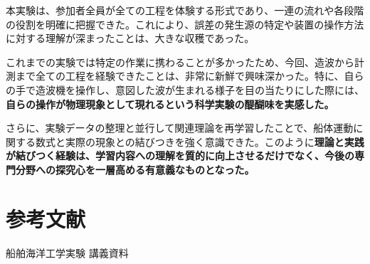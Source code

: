 \documentclass[dvipdfmx,a4paper]{jreport} %
\begin{document}
本実験は、参加者全員が全ての工程を体験する形式であり、一連の流れや各段階の役割を明確に把握できた。これにより、誤差の発生源の特定や装置の操作方法に対する理解が深まったことは、大きな収穫であった。

これまでの実験では特定の作業に携わることが多かったため、今回、造波から計測まで全ての工程を経験できたことは、非常に新鮮で興味深かった。特に、自らの手で造波機を操作し、意図した波が生まれる様子を目の当たりにした際には、\textbf{自らの操作が物理現象として現れるという科学実験の醍醐味を実感した。}

さらに、実験データの整理と並行して関連理論を再学習したことで、船体運動に関する数式と実際の現象との結びつきを強く意識できた。このように\textbf{理論と実践が結びつく経験は、学習内容への理解を質的に向上させるだけでなく、今後の専門分野への探究心を一層高める有意義なものとなった。}
\chapter{参考文献}
船舶海洋工学実験 講義資料
\end{document}
